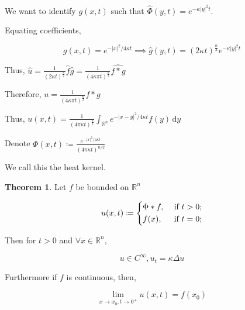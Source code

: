 \documentclass{article}
\theoremstyle{definition}
\newtheorem{theorem}{Theorem}
\begin{document}
We want to identify \(g(x,t)\) such that \(\widehat \Phi(y,t)= e^{-\kappa \vert y \vert ^2 t}\).

Equating coefficients,

\[
    \boxed{g(x,t) = e^{- \vert x \vert ^2 / 4 \kappa t} \implies \widehat g(y,t) = (2 \kappa t)^{\frac{n}{2}} e^{-\kappa \vert y \vert ^2 t} }
\]

Thus, \(\widehat u = \frac{1}{(2 \kappa t)^{\frac{n}{2}}}\widehat f\widehat g=\frac{1}{(4\kappa\pi t)^{\frac{n}{2}}}\widehat{f * g}\)

Therefore, \(u = \frac{1}{(4\kappa\pi t)^{\frac{n}{2}}} f * g\)

Thus, \(u(x,t) = \frac{1}{(4\pi \kappa t)^{\frac{n}{2}}} \int_{\mathbb{R}^n}^{} e^{-\vert x - y \vert ^2 / 4 \kappa t}f(y)  \,\mathrm{d}y \) 

Denote \(\Phi(x,t) \coloneqq \frac{e^{-\vert x \vert ^2 / 4 \kappa t}}{(4 \pi \kappa t)^{n / 2}}\) 

We call this the heat kernel.

\begin{theorem}
    Let \(f\) be bounded on \(\mathbb{R}^n\) 

    \[
        u(x,t)\coloneqq \begin{dcases}
            \Phi * f , &\text{ if } t > 0 ;\\
            f(x), &\text{ if } t = 0 ;
        \end{dcases}
    \]

    Then for \(t > 0\) and \(\forall x\in\mathbb{R}^n\),

    \[
        u \in C^{\infty}, u_t = \kappa \Delta u
    \]

    Furthermore if \(f\) is continuous, then,

    \[
        \boxed{\lim_{x \to x_0, t \to 0^+} u(x,t) = f(x_0)}
    \]

\end{theorem}
\end{document}
